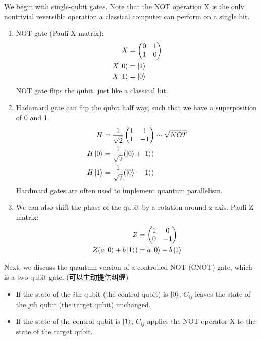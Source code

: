 We begin with single-qubit gates. Note that the NOT operation X is the only nontrivial reversible operation a classical computer can perform on a single bit. 
\begin{enumerate}
    \item NOT gate (Pauli X matrix):
    \begin{align*}
        X&=\begin{pmatrix}
            0& 1 \\ 1 & 0
        \end{pmatrix}\\
        X\ket{0}&=\ket{1}\\
        X\ket{1}&=\ket{0}
    \end{align*}
    NOT gate flips the qubit, just like a classical bit.
    \item Hadamard gate can flip the qubit half way, such that we have a superposition of 0 and 1. 
    \begin{align*}
        H&=\frac{1}{\sqrt{2}}\begin{pmatrix}
            1 & 1 \\ 1 & -1
        \end{pmatrix}\sim\sqrt{NOT}\\
        H\ket{0}&=\frac{1}{\sqrt{2}}(\ket{0}+\ket{1})\\
        H\ket{1}&=\frac{1}{\sqrt{2}}(\ket{0}-\ket{1})
    \end{align*}
    Hardmard gates are often used to implement quantum parallelism. 
    \item We can also shift the phase of the qubit by a rotation around z axis. Pauli Z matrix:
    \begin{align*}
        Z&=\begin{pmatrix}
            1 & 0 \\0&-1
        \end{pmatrix}\\
        Z(a\ket{0}+b\ket{1})&=a\ket{0}-b\ket{1}
    \end{align*}
\end{enumerate}

Next, we discuss the quantum version of a controlled-NOT (CNOT) gate, which is a two-qubit gate. (可以主动提供纠缠)
\begin{itemize}
    \item If the state of the $i$th qubit (the control qubit) is $\ket{0}$, $C_{ij}$ leaves the state of the $j$th qubit (the target qubit) unchanged.
    \item If the state of the control qubit is $\ket{1}$, $C_{ij}$ applies the NOT operator X to the state of the target qubit.
\end{itemize}

